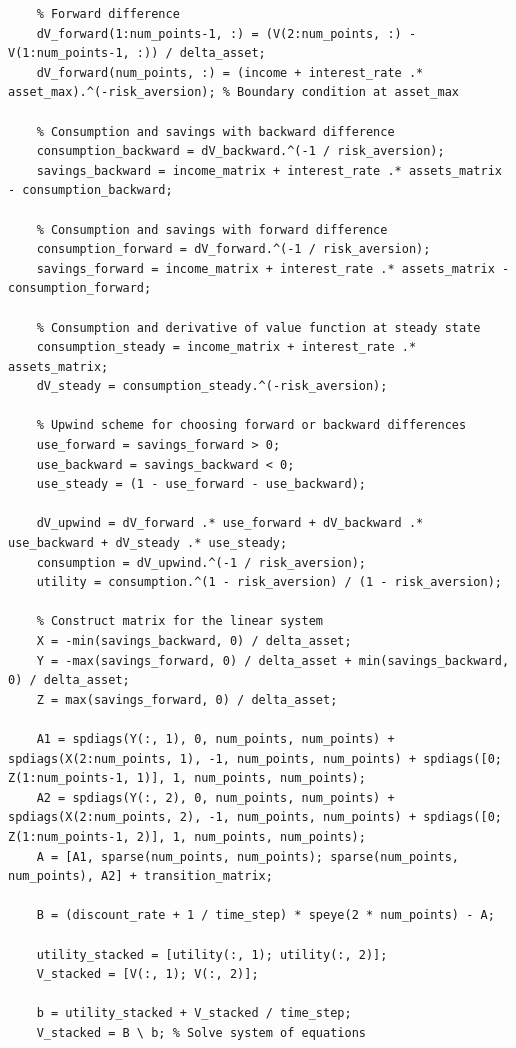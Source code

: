 \documentclass{article}
\begin{document}
\begin{lstlisting}
    % Forward difference
    dV_forward(1:num_points-1, :) = (V(2:num_points, :) - V(1:num_points-1, :)) / delta_asset;
    dV_forward(num_points, :) = (income + interest_rate .* asset_max).^(-risk_aversion); % Boundary condition at asset_max
    
    % Consumption and savings with backward difference
    consumption_backward = dV_backward.^(-1 / risk_aversion);
    savings_backward = income_matrix + interest_rate .* assets_matrix - consumption_backward;

    % Consumption and savings with forward difference
    consumption_forward = dV_forward.^(-1 / risk_aversion);
    savings_forward = income_matrix + interest_rate .* assets_matrix - consumption_forward;
    
    % Consumption and derivative of value function at steady state
    consumption_steady = income_matrix + interest_rate .* assets_matrix;
    dV_steady = consumption_steady.^(-risk_aversion);
    
    % Upwind scheme for choosing forward or backward differences
    use_forward = savings_forward > 0;
    use_backward = savings_backward < 0;
    use_steady = (1 - use_forward - use_backward);
    
    dV_upwind = dV_forward .* use_forward + dV_backward .* use_backward + dV_steady .* use_steady;
    consumption = dV_upwind.^(-1 / risk_aversion);
    utility = consumption.^(1 - risk_aversion) / (1 - risk_aversion);
    
    % Construct matrix for the linear system
    X = -min(savings_backward, 0) / delta_asset;
    Y = -max(savings_forward, 0) / delta_asset + min(savings_backward, 0) / delta_asset;
    Z = max(savings_forward, 0) / delta_asset;
    
    A1 = spdiags(Y(:, 1), 0, num_points, num_points) + spdiags(X(2:num_points, 1), -1, num_points, num_points) + spdiags([0; Z(1:num_points-1, 1)], 1, num_points, num_points);
    A2 = spdiags(Y(:, 2), 0, num_points, num_points) + spdiags(X(2:num_points, 2), -1, num_points, num_points) + spdiags([0; Z(1:num_points-1, 2)], 1, num_points, num_points);
    A = [A1, sparse(num_points, num_points); sparse(num_points, num_points), A2] + transition_matrix;
    
    B = (discount_rate + 1 / time_step) * speye(2 * num_points) - A;
    
    utility_stacked = [utility(:, 1); utility(:, 2)];
    V_stacked = [V(:, 1); V(:, 2)];
    
    b = utility_stacked + V_stacked / time_step;
    V_stacked = B \ b; % Solve system of equations
    

\end{lstlisting}
\end{document}
